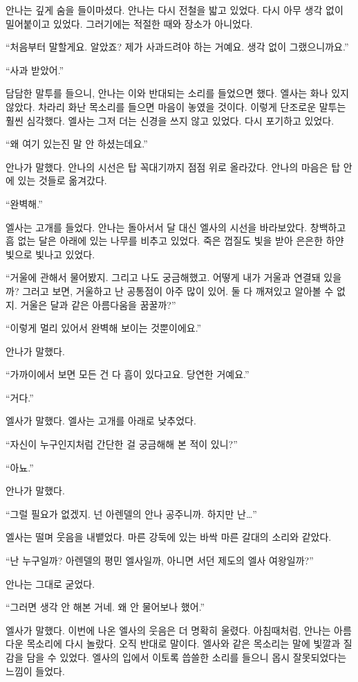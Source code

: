 안나는 깊게 숨을 들이마셨다. 안나는 다시 전철을 밟고 있었다. 다시 아무 생각 없이 밀어붙이고 있었다. 그러기에는 적절한 때와 장소가 아니었다.

``처음부터 말할게요. 알았죠? 제가 사과드려야 하는 거예요. 생각 없이 그랬으니까요.''

``사과 받았어.''

담담한 말투를 들으니, 안나는 이와 반대되는 소리를 들었으면 했다. 엘사는 화나 있지 않았다. 차라리 화난 목소리를 들으면 마음이 놓였을 것이다. 이렇게 단조로운 말투는 훨씬 심각했다. 엘사는 그저 더는 신경을 쓰지 않고 있었다. 다시 포기하고 있었다.

``왜 여기 있는진 말 안 하셨는데요.''

안나가 말했다. 안나의 시선은 탑 꼭대기까지 점점 위로 올라갔다. 안나의 마음은 탑 안에 있는 것들로 옮겨갔다.

`` 완벽해.''

엘사는 고개를 들었다. 안나는 돌아서서 달 대신 엘사의 시선을 바라보았다. 창백하고 흠 없는 달은 아래에 있는 나무를 비추고 있었다. 죽은 껍질도 빛을 받아 은은한 하얀 빛으로 빛나고 있었다.

``거울에 관해서 물어봤지. 그리고 나도 궁금해했고. 어떻게 내가 거울과 연결돼 있을까? 그러고 보면, 거울하고 난 공통점이 아주 많이 있어. 둘 다 깨져있고 알아볼 수 없지. 거울은 달과 같은 아름다움을 꿈꿀까?''

``이렇게 멀리 있어서 완벽해 보이는 것뿐이에요.''

안나가 말했다.

``가까이에서 보면 모든 건 다 흠이 있다고요. 당연한 거예요.''

`` 거다.''

엘사가 말했다. 엘사는 고개를 아래로 낮추었다.

``자신이 누구인지처럼 간단한 걸 궁금해해 본 적이 있니?''

``아뇨.''

안나가 말했다.

``그럴 필요가 없겠지. 넌 아렌델의 안나 공주니까. 하지만 난\ldots''

엘사는 떨며 웃음을 내뱉었다. 마른 강둑에 있는 바싹 마른 갈대의 소리와 같았다.

``난 누구일까? 아렌델의 평민 엘사일까, 아니면 서던 제도의 엘사 여왕일까?''

안나는 그대로 굳었다.

``그러면 생각 안 해본 거네. 왜 안 물어보나 했어.''

엘사가 말했다. 이번에 나온 엘사의 웃음은 더 명확히 울렸다. 아침때처럼, 안나는 아름다운 목소리에 다시 놀랐다. 오직 반대로 말이다. 엘사와 같은 목소리는 말에 빛깔과 질감을 담을 수 있었다. 엘사의 입에서 이토록 씁쓸한 소리를 들으니 몹시 잘못되었다는 느낌이 들었다.

